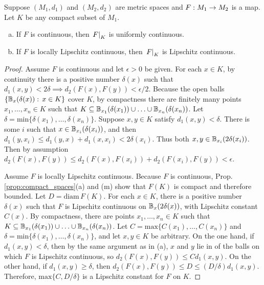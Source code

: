 \documentclass[11pt,a4paper]{article}
\begin{document}
\begin{proposition}
Suppose $(M_1,d_1)$ and $(M_2,d_2)$ are metric spaces and $F:M_1\rightarrow M_2$ is a map. Let $K$ be any compact subset of $M_1$.
\begin{enumerate}[(a)]
    \item If $F$ is continuous, then $\left.F\right|_{K}$ is uniformly continuous.
    \item If $F$ is locally Lipschitz continuous, then $\left.F\right|_{K}$ is  Lipschitz continuous.
\end{enumerate}
\end{proposition}

\begin{proof}
 Assume $F$ is continuous and let $\epsilon>0$ be given. For each $x\in K$, by continuity there is a positive number $\delta(x)$ such that $d_1(x,y)<2\delta\implies d_2(F(x),F(y))<\epsilon/2$. Because the open balls $\{\mathbb{B}_{x}(\delta(x)):\,x\in K\}$ cover $K$, by compactness there are finitely many points $x_1,\ldots,x_n\in K$ such that $K\subseteq \mathbb{B}_{x_1}(\delta(x_1))\cup\ldots\cup \mathbb{B}_{x_n}(\delta(x_n))$. Let $\delta=\text{min}\{\delta(x_1),\ldots,\delta(x_n)\}$. Suppose $x,y\in K$ satisfy $d_1(x,y)<\delta$. There is some $i$ such that $x\in \mathbb{B}_{x_i}(\delta(x_i))$, and then $d_1(y,x_i)\le d_1(y,x)+d_1(x,x_i)<2\delta(x_i)$. Thus both $x,y\in \mathbb{B}_{x_i}(2\delta(x_i))$. Then by assumption $d_2(F(x),F(y))\le d_2(F(x),F(x_i)) + d_2(F(x_i),F(y)) < \epsilon$.

 Assume $F$ is locally Lipschitz continuous. Because $F$ is continuous, Prop. \ref{prop:compact_spaces}(a) and (m) show that $F(K)$ is compact and therefore bounded. Let $D = \text{diam}\,F(K)$. For each $x\in K$, there is a positive number $\delta(x)$ such that $F$ is Lipschitz continuous on $\mathbb{B}_{x}(2\delta(x))$, with Lipschitz constant $C(x)$. By compactness, there are points $x_1,\ldots,x_n\in K$ such that $K\subseteq \mathbb{B}_{x_1}(\delta(x_1))\cup\ldots\cup \mathbb{B}_{x_n}(\delta(x_n))$. Let $C = \text{max}\{C(x_1),\ldots,C(x_n)\}$ and $\delta = \text{min}\{\delta(x_1),\ldots,\delta(x_n)\}$, and let $x,y\in K$ be arbitrary. On the one hand, if $d_1(x,y)<\delta$, then by the same argument as in (a), $x$ and $y$ lie in of the balls on which $F$ is Lipschitz continuous, so $d_2(F(x),F(y))\le Cd_1(x,y)$. On the other hand, if $d_1(x,y)\ge \delta$, then $d_2(F(x),F(y))\le D\le (D/\delta)d_1(x,y)$. Therefore, $\text{max}\{C,D/\delta\}$ is a Lipschitz constant for $F$ on $K$.
\end{proof}
\end{document}
